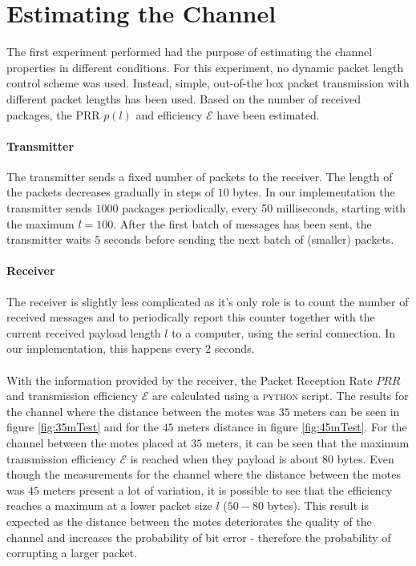 \section{Estimating the Channel\label{sec:chanEst}}

The first experiment performed had the purpose of estimating the channel properties in different conditions. For this experiment, no dynamic packet length control scheme was used. Instead, simple, out-of-the box packet transmission  with different packet lengths has been used. Based on the number of received packages, the PRR $p(l)$ and efficiency $\mathcal{E}$ have been estimated.

\paragraph{Transmitter} The transmitter sends a fixed number of packets to the receiver. The length of the packets decreases gradually in steps of $10$ bytes. In our implementation the transmitter sends $1000$ packages periodically, every 50 milliseconds, starting with the maximum $l = 100$. After the first batch of messages has been sent, the transmitter waits $5$ seconds before sending the next batch of (smaller) packets.

\paragraph{Receiver} The receiver is slightly less complicated as it's only role is to count the number of received messages and to periodically report this counter together with the current received payload length $l$ to a computer, using the serial connection. In our implementation, this happens every $2$ seconds.

\paragraph{}With the information provided by the receiver, the Packet Reception Rate $PRR$ and transmission efficiency $\mathcal{E}$ are calculated using a \textsc{python} script. The results for the channel where the distance between the motes was $35$ meters can be seen in figure \ref{fig:35mTest} and for the $45$ meters distance in figure \ref{fig:45mTest}. For the channel between the motes placed at $35$ meters, it can be seen that the maximum transmission efficiency $\mathcal{E}$ is reached when they payload is about $80$ bytes. Even though the measurements for the channel where the distance between the motes was $45$ meters present a lot of variation, it is possible to see that the efficiency reaches a maximum at a lower packet size $l$ ($50-80$ bytes). This result is expected as the distance between the motes deteriorates the quality of the channel and increases the probability of bit error - therefore the probability of corrupting a larger packet.

